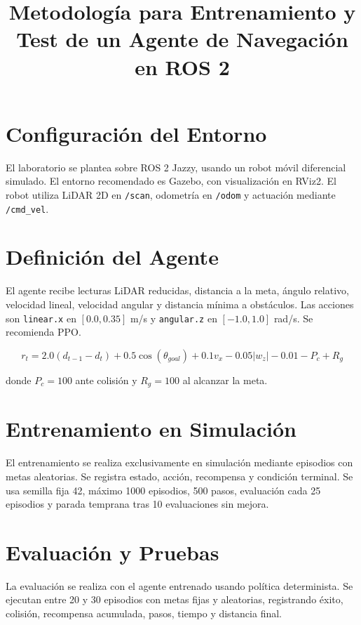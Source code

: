 \documentclass[conference]{IEEEtran}
\title{Metodología para Entrenamiento y Test de un Agente de Navegación en ROS 2}
\author{\IEEEauthorblockN{Grupo de Robótica IMT-342}}
\begin{document}
\maketitle

\section{Configuración del Entorno}
El laboratorio se plantea sobre ROS 2 Jazzy, usando un robot móvil diferencial simulado. El entorno recomendado es Gazebo, con visualización en RViz2. El robot utiliza LiDAR 2D en \texttt{/scan}, odometría en \texttt{/odom} y actuación mediante \texttt{/cmd\_vel}.

\section{Definición del Agente}
El agente recibe lecturas LiDAR reducidas, distancia a la meta, ángulo relativo, velocidad lineal, velocidad angular y distancia mínima a obstáculos. Las acciones son \texttt{linear.x} en $[0.0,0.35]$ m/s y \texttt{angular.z} en $[-1.0,1.0]$ rad/s. Se recomienda PPO.

\[
r_t = 2.0(d_{t-1}-d_t)+0.5\cos(\theta_{goal})+0.1v_x-0.05|w_z|-0.01-P_c+R_g
\]

donde $P_c=100$ ante colisión y $R_g=100$ al alcanzar la meta.

\section{Entrenamiento en Simulación}
El entrenamiento se realiza exclusivamente en simulación mediante episodios con metas aleatorias. Se registra estado, acción, recompensa y condición terminal. Se usa semilla fija 42, máximo 1000 episodios, 500 pasos, evaluación cada 25 episodios y parada temprana tras 10 evaluaciones sin mejora.

\section{Evaluación y Pruebas}
La evaluación se realiza con el agente entrenado usando política determinista. Se ejecutan entre 20 y 30 episodios con metas fijas y aleatorias, registrando éxito, colisión, recompensa acumulada, pasos, tiempo y distancia final.
\end{document}
